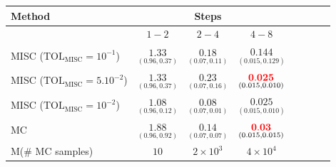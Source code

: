

\begin{table}[h!]
	\centering
	\begin{tabular}{l*{6}{c}r}
		\toprule[1.5pt]
	Method & & Steps  & &     \\
	\hline
		          & $1-2$ & $2-4$ & $4-8$  \\
		\hline
		MISC ($\text{TOL}_{\text{MISC}}=10^{-1}$)  & $\underset{(0.96,0.37)}{\mathbf{  1.33}}$ & $\underset{(0.07,0.11)}{\mathbf{0.18}}$ & $\underset{(0.015,0.129)}{\mathbf{0.144}}$   \\
		MISC ($\text{TOL}_{\text{MISC}}=5.10^{-2}$)  & $\underset{(0.96,0.37)}{\mathbf{  1.33}}$ & $\underset{(0.07,0.16)}{\mathbf{ 0.23}}$ & $\underset{(0.015,0.010)}{\mathbf{  {\color{red}0.025}}}$   \\
		MISC ($\text{TOL}_{\text{MISC}}=10^{-2}$)  & $\underset{(0.96,0.12)}{\mathbf{   1.08
		}}$ & $\underset{(0.07,0.01)}{\mathbf{0.08}}$ & $\underset{(0.015,0.010)}{\mathbf{ 0.025}}$  \\
		

%		
		
				\hline
		
		MC &$\underset{(0.96,0.92)}{\mathbf{1.88}}$  & $\underset{(0.07,0.07)}{\mathbf{0.14}}$ & $\underset{(0.015,0.015)}{\mathbf{{\color{red}0.03}}}$  \\
		M(\# MC samples) & $10$  & $2 \times 10^3$ & $4 \times 10^4$  \\


\end{tabular}
\end{table}
